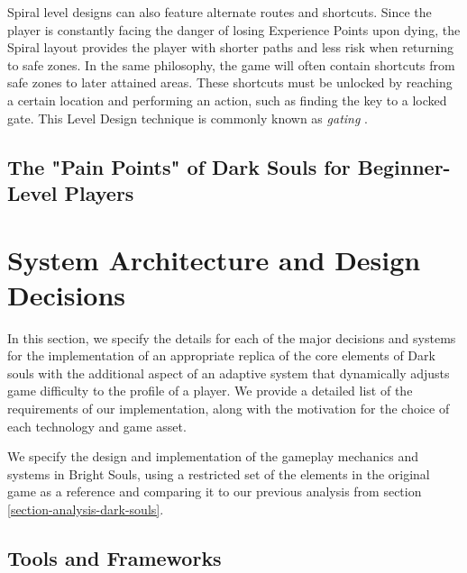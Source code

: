 \documentclass[cic,tc,english]{iiufrgs}
\begin{document}
Spiral level designs can also feature alternate routes and shortcuts. Since the player is constantly facing the danger of losing Experience Points upon dying, the Spiral layout provides the player with shorter paths and less risk when returning to safe zones. In the same philosophy, the game will often contain shortcuts from safe zones to later attained areas. These shortcuts must be unlocked by reaching a certain location and performing an action, such as finding the key to a locked gate. This Level Design technique is commonly known as \emph{gating} \cite{BOOK_LevelUpTheGuideToGreat}.

\subsection{The "Pain Points" of Dark Souls for Beginner-Level Players}

\section{System Architecture and Design Decisions}

In this section, we specify the details for each of the major decisions and systems for the implementation of an appropriate replica of the core elements of Dark souls with the additional aspect of an adaptive system that dynamically adjusts game difficulty to the profile of a player. We provide a detailed list of the requirements of our implementation, along with the motivation for the choice of each technology and game asset.

We specify the design and implementation of the gameplay mechanics and systems in Bright Souls, using a restricted set of the elements in the original game as a reference and comparing it to our previous analysis from section \ref{section-analysis-dark-souls}.

\subsection{Tools and Frameworks}

\end{document}
